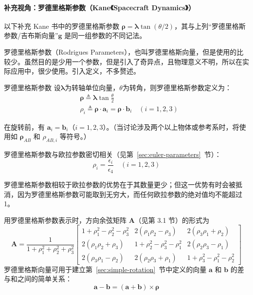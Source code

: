 \paragraph*{补充视角：罗德里格斯参数（Kane《Spacecraft Dynamics》）}

以下补充 Kane 书中的罗德里格斯参数 $\bm{\rho}=\bm{\lambda}\tan(\theta/2)$，其与上列“罗德里格斯参数/吉布斯向量”$\bm{g}$ 是同一组参数的不同记法。

罗德里格斯参数（Rodrigues Parameters），也叫罗德里格斯向量，但是使用的比较少。虽然目的是少用一个参数，但是引入了奇异点，且物理意义不明，所以在实际应用中，很少使用。引入定义，不多赘述。
\begin{mydefinition}{罗德里格斯参数}
    设$\bm{\lambda}$为转轴单位向量，$\theta$为转角，则罗德里格斯参数定义为：
    \begin{equation}
        \label{eq:罗德里格斯参数定义}
        \begin{aligned}
            &\bm{\rho} \triangleq \bm{\lambda}\tan \frac{\theta}{2}\\
            &\rho_i \triangleq \bm{\rho} \cdot \bm{a}_i=\bm{\rho} \cdot \bm{b}_i\quad(i=1,2,3)
        \end{aligned}
    \end{equation}
\end{mydefinition}
在旋转前，有 $\mathbf{a}_i = \mathbf{b}_i$（$i = 1, 2, 3$）。（当讨论涉及两个以上物体或参考系时，将使用如 $\bm{\rho}_{AB}$ 和 $\rho_{AB,i}$ 等符号。）

罗德里格斯参数与欧拉参数密切相关（见第~\ref{sec:euler-parameters}~节）：
$$\rho_i = \frac{\epsilon_i}{\epsilon_4} \quad (i = 1, 2, 3)$$

罗德里格斯参数相较于欧拉参数的优势在于其数量更少；但这一优势有时会被抵消，因为罗德里格斯参数可能取到无穷大，而任何欧拉参数的绝对值均不能超过1。

用罗德里格斯参数表示时，方向余弦矩阵 $\bm{A}$（见第 3.1 节）的形式为
$$
\bm{A} = \frac{1}{1 + \rho_1^2 + \rho_2^2 + \rho_3^2}
\begin{bmatrix}
1 + \rho_1^2 - \rho_2^2 - \rho_3^2 & 2(\rho_1 \rho_2 - \rho_3) & 2(\rho_3 \rho_1 + \rho_2) \\
2(\rho_1 \rho_2 + \rho_3) & 1 + \rho_2^2 - \rho_3^2 - \rho_1^2 & 2(\rho_2 \rho_3 - \rho_1) \\
2(\rho_3 \rho_1 - \rho_2) & 2(\rho_2 \rho_3 + \rho_1) & 1 + \rho_3^2 - \rho_1^2 - \rho_2^2
\end{bmatrix}
$$
罗德里格斯向量可用于建立第~\ref{sec:simple-rotation}~节中定义的向量 $\mathbf{a}$ 和 $\mathbf{b}$ 的差与和之间的简单关系：
\begin{equation}
    \label{eq:罗德里格斯向量表示的和差关系}
    \mathbf{a} - \mathbf{b} = (\mathbf{a} + \mathbf{b}) \times \bm{\rho}
\end{equation}

